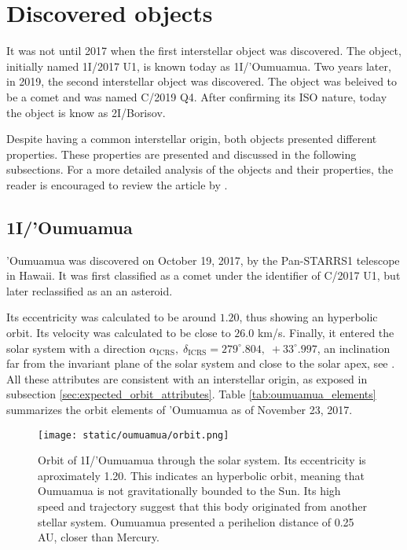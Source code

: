 \section{Discovered objects}

It was not until 2017 when the first interstellar object was discovered. The
object, initially named 1I/2017 U1, is known today as 1I/'Oumuamua. Two years
later, in 2019, the second interstellar object was discovered. The object was
beleived to be a comet and was named C/2019 Q4. After confirming its ISO nature,
today the object is know as 2I/Borisov. 

Despite having a common interstellar origin, both objects presented different
properties. These properties are presented and discussed in the following
subsections. For a more detailed analysis of the objects and their properties,
the reader is encouraged to review the article by \cite{jewitt2023}.

\subsection{1I/'Oumuamua}

'Oumuamua was discovered on October 19, 2017, by the Pan-STARRS1 telescope in
Hawaii. It was first classified as a comet under the identifier of C/2017 U1,
but later reclassified as an an asteroid.

Its eccentricity was calculated to be around $1.20$, thus showing an hyperbolic
orbit. Its velocity was calculated to be close to $26.0$ km/s. Finally, it
entered the solar system with a direction $\alpha_{\text{ICRS}},\;
\delta_{\text{ICRS}} = 279^\circ.804,\; +33^\circ.997$, an inclination far from
the invariant plane of the solar system and close to the solar apex, see
\cite{mamajek2017}. All these attributes are consistent with an interstellar
origin, as exposed in subsection \ref{sec:expected_orbit_attributes}. Table
\ref{tab:oumuamua_elements} summarizes the orbit elements of 'Oumuamua as of
November 23, 2017.


\begin{figure}[H]
  \centering
  \texttt{[image: static/oumuamua/orbit.png]}
  \caption[Orbit of 1I/'Oumuamua through the solar system]{
    Orbit of 1I/'Oumuamua through the solar system. Its eccentricity is
    aproximately 1.20. This indicates an hyperbolic orbit, meaning that
    Oumuamua is not gravitationally bounded to the Sun. Its high speed and
    trajectory suggest that this body originated from another stellar system.
    Oumuamua presented a perihelion distance of 0.25 AU, closer than Mercury.
  }
  \label{fig:oumuamua_orbit2}
\end{figure}


